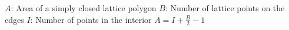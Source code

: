 $A$:
Area of a simply closed lattice polygon \newline
$B$:
Number of lattice points on the edges \newline
$I$:
Number of points in the interior \newline
$A = I + \frac{B}{2} - 1$
